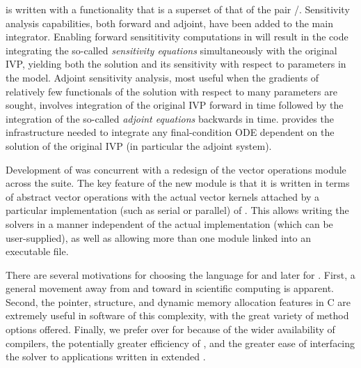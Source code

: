{\cvodes} is written with a functionality that is a superset of that of the pair
{\cvode}/{\pvode}. Sensitivity analysis capabilities, both forward and adjoint, 
have been added to the main integrator. Enabling forward sensititivity computations 
in {\cvodes} will result in the code integrating the so-called {\em sensitivity equations}
simultaneously with the original IVP, yielding both the solution and its sensitivity
with respect to parameters in the model. Adjoint sensitivity analysis, most useful
when the gradients of relatively few functionals of the solution with respect to
many parameters are sought, involves integration of the original IVP forward in time
followed by the integration of the so-called {\em adjoint equations} backwards
in time. {\cvodes} provides the infrastructure needed to integrate any final-condition ODE
dependent on the solution of the original IVP (in particular the adjoint system). 

Development of {\cvodes} was concurrent with a redesign of the vector operations module
across the {\sundials} suite. The key feature of the new {\nvector} module is that it
is written in terms of abstract vector operations with the actual vector kernels attached
by a particular implementation (such as serial or parallel) of {\nvector}. This allows
writing the {\sundials} solvers in a manner independent of the actual {\nvector} 
implementation (which can be user-supplied), as well as allowing more than one 
{\nvector} module linked into an executable file.

There are several motivations for choosing the {\C} language for {\cvode} and later
for {\cvodes}.
First, a general movement away from {\F} and toward {\C} in scientific
computing is apparent.  Second, the pointer, structure, and dynamic
memory allocation features in C are extremely useful in software of
this complexity, with the great variety of method options offered.
Finally, we prefer {\C} over {\CPP} for {\cvodes} because of the wider
availability of {\C} compilers, the potentially greater efficiency of {\C},
and the greater ease of interfacing the solver to applications written
in extended {\F}.

